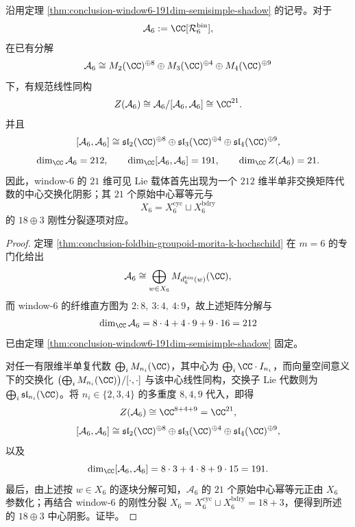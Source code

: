 \begin{theorem}\label{thm:conclusion-window6-matrix-envelope-abelian-shadow}
沿用定理 \ref{thm:conclusion-window6-191dim-semisimple-shadow} 的记号。对于
\[
\mathcal A_6:=\CC[\mathcal R_6^{\mathrm{bin}}],
\]
在已有分解
\[
\mathcal A_6
\cong
M_2(\CC)^{\oplus 8}\oplus M_3(\CC)^{\oplus 4}\oplus M_4(\CC)^{\oplus 9}
\]
下，有规范线性同构
\[
Z(\mathcal A_6)
\cong
\mathcal A_6/[\mathcal A_6,\mathcal A_6]
\cong
\CC^{21}.
\]
并且
\[
[\mathcal A_6,\mathcal A_6]
\cong
\mathfrak{sl}_2(\CC)^{\oplus 8}
\oplus
\mathfrak{sl}_3(\CC)^{\oplus 4}
\oplus
\mathfrak{sl}_4(\CC)^{\oplus 9},
\]
\[
\dim_{\CC}\mathcal A_6=212,\qquad
\dim_{\CC}[\mathcal A_6,\mathcal A_6]=191,\qquad
\dim_{\CC} Z(\mathcal A_6)=21.
\]
因此，window-\(6\) 的 \(21\) 维可见 Lie 载体首先出现为一个 \(212\) 维半单非交换矩阵代数的中心交换化阴影；其 \(21\) 个原始中心幂等元与
\[
X_6=X_6^{\mathrm{cyc}}\sqcup X_6^{\mathrm{bdry}}
\]
的 \(18\oplus 3\) 刚性分裂逐项对应。
\end{theorem}
\begin{proof}
定理 \ref{thm:conclusion-foldbin-groupoid-morita-k-hochschild} 在 \(m=6\) 的专门化给出
\[
\mathcal A_6
\cong
\bigoplus_{w\in X_6} M_{d_6^{\mathrm{bin}}(w)}(\CC),
\]
而 window-\(6\) 的纤维直方图为 \(2:8,\ 3:4,\ 4:9\)，故上述矩阵分解与
\[
\dim_{\CC}\mathcal A_6=8\cdot 4+4\cdot 9+9\cdot 16=212
\]
已由定理 \ref{thm:conclusion-window6-191dim-semisimple-shadow} 固定。

对任一有限维半单复代数 \(\bigoplus_i M_{n_i}(\CC)\)，其中心为 \(\bigoplus_i \CC\cdot I_{n_i}\)，而向量空间意义下的交换化 \(\bigl(\bigoplus_i M_{n_i}(\CC)\bigr)/[\cdot,\cdot]\) 与该中心线性同构，交换子 Lie 代数则为 \(\bigoplus_i \mathfrak{sl}_{n_i}(\CC)\)。将 \(n_i\in\{2,3,4\}\) 的多重度 \(8,4,9\) 代入，即得
\[
Z(\mathcal A_6)\cong \CC^{8+4+9}=\CC^{21},
\]
\[
[\mathcal A_6,\mathcal A_6]
\cong
\mathfrak{sl}_2(\CC)^{\oplus 8}\oplus \mathfrak{sl}_3(\CC)^{\oplus 4}\oplus \mathfrak{sl}_4(\CC)^{\oplus 9},
\]
以及
\[
\dim_{\CC}[\mathcal A_6,\mathcal A_6]
=8\cdot 3+4\cdot 8+9\cdot 15
=191.
\]
最后，由上述按 \(w\in X_6\) 的逐块分解可知，\(\mathcal A_6\) 的 \(21\) 个原始中心幂等元正由 \(X_6\) 参数化；再结合 window-\(6\) 的刚性分裂 \(X_6=X_6^{\mathrm{cyc}}\sqcup X_6^{\mathrm{bdry}}=18+3\)，便得到所述的 \(18\oplus 3\) 中心阴影。证毕。
\end{proof}

